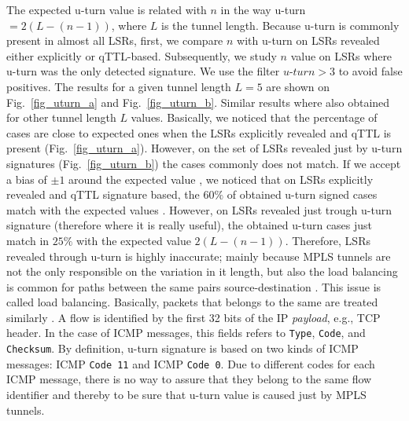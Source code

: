The expected u-turn value is related with $n$ in the way u-turn$=2(L-(n-1))$,
where $L$ is the tunnel length. Because u-turn is commonly present in almost all
LSRs, first, we compare $n$ with u-turn on LSRs revealed either explicitly or
qTTL-based. Subsequently, we study $n$ value on LSRs where u-turn was the only
detected signature. We use the filter $\textit{u-turn}>3$  to avoid false
positives. The results for a given tunnel length $L=5$ are shown on
Fig.~\ref{fig_uturn_a} and Fig.~\ref{fig_uturn_b}. Similar results where also
obtained for other tunnel length $L$ values. Basically, we noticed that the
percentage of cases  are close to expected ones when the LSRs
explicitly revealed  and qTTL is present
(Fig.~\ref{fig_uturn_a}). However, on the set of LSRs revealed just by u-turn
signatures (Fig.~\ref{fig_uturn_b}) the cases 
commonly does not match. If we accept a bias of $ \pm 1$ around the expected
value , we noticed that on LSRs explicitly revealed and qTTL
signature based, the $60\%$ of obtained u-turn signed cases match with the
expected values . However, on LSRs revealed just trough
u-turn signature (therefore where it is really useful), the obtained u-turn
cases just match in $25\%$ with the expected value $2(L-(n-1))$.
Therefore, LSRs revealed  through u-turn is highly inaccurate; mainly
because MPLS tunnels are not the only responsible on the variation in it length, but
also the load balancing is common for paths between the same pairs
source-destination \cite{BRICE07}. This issue is called  load
balancing. Basically, packets that belongs to the same  are treated
similarly \cite{BRICE06}. A flow is identified by the first 32 bits of the IP
\textit{payload}, e.g., TCP header. In the case of ICMP messages, this fields
refers to \texttt{Type}, \texttt{Code}, and \texttt{Checksum}.
By definition, u-turn signature is based on two kinds of ICMP messages:
ICMP \echoreply \texttt{Code 11} and ICMP \ttlexceeded \texttt{Code 0}.
Due to different codes for each ICMP message, there is no way to assure that
they belong to the same flow identifier and thereby to be sure that u-turn value
is caused just by MPLS tunnels.  
